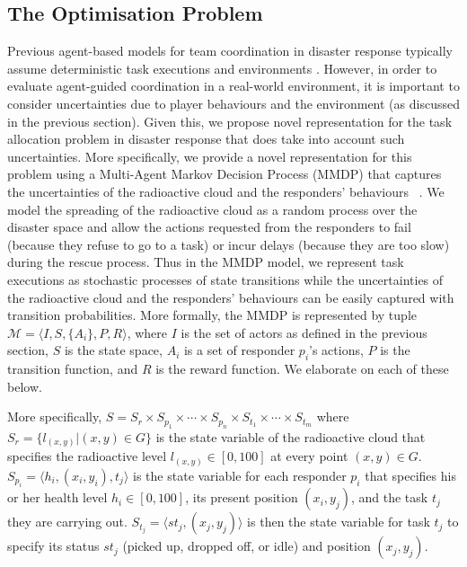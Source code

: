 \subsection{The Optimisation Problem}
\label{sec:model}
\noindent Previous agent-based models for team coordination in disaster response typically assume deterministic task executions and environments \cite{ramchurn:etal:2010,Scerri2005}. However, in order to evaluate agent-guided coordination in a real-world environment, it is important to consider uncertainties due to player behaviours and the environment (as discussed in the previous section). Given this, we propose novel representation for the task allocation problem in disaster response that does take into account such uncertainties. More specifically, we provide a novel representation for this problem using a Multi-Agent Markov Decision Process (MMDP) that captures the uncertainties of the radioactive cloud and the responders' behaviours ~\cite{boutilier1996planning}. We model the spreading of the radioactive cloud as a random process over the disaster space and allow the actions requested from the responders to  fail (because they refuse to go to a  task) or incur delays (because they are too slow) during the rescue process. Thus in the MMDP model, we represent  task executions as stochastic processes of state transitions while the uncertainties of the radioactive cloud and the responders' behaviours can be easily captured with transition probabilities.  More formally, the MMDP is
represented by tuple $\mathcal{M} = \langle I, S, \{A_i\}, P, R
\rangle$, where $I$ is the set of actors as defined in the previous
section,  $S$ is the state space, $A_i$ is a set of responder
$p_i$'s actions, $P$ is the transition function, and $R$ is the
reward function. We elaborate on each of these below.

More specifically, $S= S_r \times S_{p_1} \times \cdots \times
S_{p_n} \times S_{t_1} \times \cdots \times S_{t_m}$ where $S_r =
\{l_{(x,y)}| (x, y) \in G\}$ is the state variable of the
radioactive cloud that specifies the radioactive level $l_{(x,y)}\in[0,
100]$ at every point $(x, y)\in G$. $S_{p_i} = \langle h_i, (x_i,
y_i), t_j \rangle$ is the state variable for each responder $p_i$
that specifies his or her health level $h_i\in[0, 100]$, its present position
$(x_i, y_j)$, and the task $t_j$ they are carrying out. $S_{t_j}
= \langle st_j, (x_j, y_j) \rangle$ is then the state variable for
task $t_j$ to specify its status $st_j$ (picked up, dropped off, or
idle) and position $(x_j, y_j)$.

